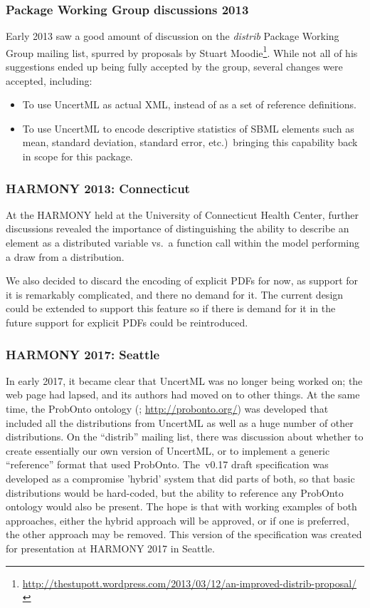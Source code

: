 \documentclass[draftspec]{sbmlpkgspec}
\newcommand{\distribshort}{\emph{distrib}\xspace}
\begin{document}
\subsubsection{Package Working Group discussions 2013}

Early 2013 saw a good amount of discussion on the \distribshort Package Working Group mailing list, spurred by proposals by Stuart Moodie\footnote{\url{http://thestupott.wordpress.com/2013/03/12/an-improved-distrib-proposal/}}.  While not all of his suggestions ended up being fully accepted by the group, several changes were accepted, including:

\begin{itemize}
\item To use UncertML as actual XML, instead of as a set of reference definitions.
\item To use UncertML to encode descriptive statistics of SBML elements such as mean, standard deviation, standard error, etc.)\ bringing this capability back in scope for this package.
\end{itemize}


\subsubsection{HARMONY 2013: Connecticut}

At the HARMONY held at the University of Connecticut Health Center, further discussions revealed the importance of distinguishing the ability to describe an element as a distributed variable vs.\ a function call within the model performing a draw from a distribution.

We also decided to discard the encoding of explicit PDFs for now, as
support for it is remarkably complicated, and there no demand for
it. The current design could be extended to support this feature so if
there is demand for it in the future support for explicit PDFs could
be reintroduced.

\subsubsection{HARMONY 2017: Seattle}

In early 2017, it became clear that UncertML was no longer being worked on; the web page had lapsed, and its authors had moved on to other things.  At the same time, the ProbOnto ontology (\citealt{swat:2016}; \url{http://probonto.org/}) was developed that included all the distributions from UncertML as well as a huge number of other distributions.  On the ``distrib'' mailing list, there was discussion about whether to create essentially our own version of UncertML, or to implement a generic ``reference'' format that used ProbOnto.  The~v0.17 draft specification was developed as a compromise 'hybrid' system that did parts of both, so that basic distributions would be hard-coded, but the ability to reference any ProbOnto ontology would also be present.  The hope is that with working examples of both approaches, either the hybrid approach will be approved, or if one is preferred, the other approach may be removed.  This version of the specification was created for presentation at HARMONY 2017 in Seattle.
\end{document}
